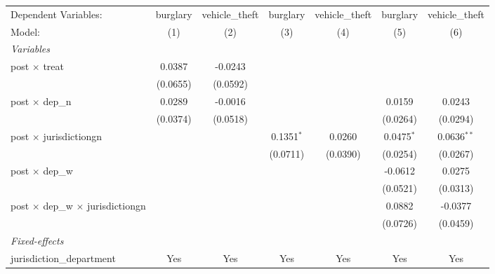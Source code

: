 \begingroup
\centering
\begin{tabular}{lcccccc}
   \tabularnewline \midrule \midrule
   Dependent Variables:                            & burglary & vehicle\_theft  & burglary     & vehicle\_theft  & burglary     & vehicle\_theft\\   
   Model:                                          & (1)      & (2)             & (3)          & (4)             & (5)          & (6)\\  
   \midrule
   \emph{Variables}\\
   post $\times$ treat                             & 0.0387   & -0.0243         &              &                 &              &   \\   
                                                   & (0.0655) & (0.0592)        &              &                 &              &   \\   
   post $\times$ dep\_n                            & 0.0289   & -0.0016         &              &                 & 0.0159       & 0.0243\\   
                                                   & (0.0374) & (0.0518)        &              &                 & (0.0264)     & (0.0294)\\   
   post $\times$ jurisdictiongn                    &          &                 & 0.1351$^{*}$ & 0.0260          & 0.0475$^{*}$ & 0.0636$^{**}$\\   
                                                   &          &                 & (0.0711)     & (0.0390)        & (0.0254)     & (0.0267)\\   
   post $\times$ dep\_w                            &          &                 &              &                 & -0.0612      & 0.0275\\   
                                                   &          &                 &              &                 & (0.0521)     & (0.0313)\\   
   post $\times$ dep\_w $\times$ jurisdictiongn    &          &                 &              &                 & 0.0882       & -0.0377\\   
                                                   &          &                 &              &                 & (0.0726)     & (0.0459)\\   
   \midrule
   \emph{Fixed-effects}\\
   jurisdiction\_department                        & Yes      & Yes             & Yes          & Yes             & Yes          & Yes\\  

\end{tabular}
